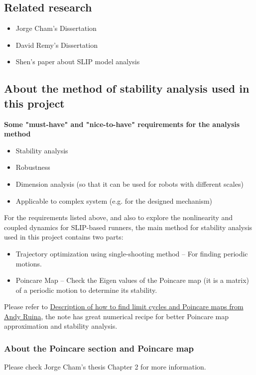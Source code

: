 \subsection{Related research}
\begin{itemize}
	\item Jorge Cham's Dissertation \cite{Cham2002}
	\item David Remy's Dissertation \cite{Remy2011}
	\item Shen's paper about SLIP model analysis \cite{Shen2016}
\end{itemize}

\subsection{About the method of stability analysis used in this project}
\textbf{Some "must-have" and "nice-to-have" requirements for the analysis method}
\begin{itemize}
\item Stability analysis
\item Robustness
\item Dimension analysis (so that it can be used for robots with different scales)
\item Applicable to complex system (e.g. for the designed mechanism)
\end{itemize}

For the requirements listed above, and also to explore the nonlinearity and coupled dynamics for SLIP-based runners, the main method for stability analysis used in this project contains two parts:
\begin{itemize}
	\item Trajectory optimization using single-shooting method -- For finding periodic motions.
	\item Poincare Map -- Check the Eigen values of the Poincare map (it is a matrix) of a periodic motion to determine its stability.
\end{itemize}

\noindent Please refer to
\href{https://confluence.ihmc.us/display/FR/Description+of+how+to+find+limit+cycles+and+Poincare+maps+from+Andy+Ruina}{Description of how to find limit cycles and Poincare maps from Andy Ruina}, the note has great numerical recipe for better Poincare map approximation and stability analysis.

\subsubsection{About the Poincare section and Poincare map}
Please check Jorge Cham's thesis \cite{Cham2002} Chapter 2 for more information.
